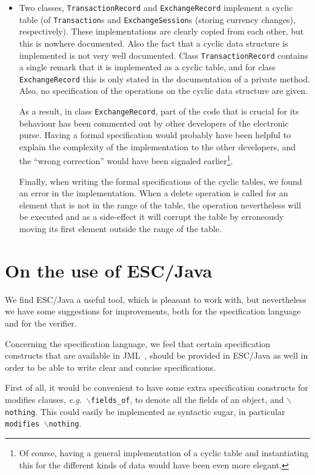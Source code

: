 \documentclass[a4paper]{llncs}
\newcommand{\noth}{\(\backslash\)\texttt{nothing}}
\newcommand{\fieldsof}{\(\backslash\)\texttt{fields\_of}}
\begin{document}
\begin{itemize}
\item Two classes, \texttt{TransactionRecord} and
\texttt{ExchangeRecord} implement a cyclic table (of
\texttt{Transaction}s and
\texttt{ExchangeSession}s (storing currency changes),
respectively).  These implementations are clearly copied from each
other, but this is nowhere documented. Also the fact that a
cyclic data structure is implemented is not very well documented. Class
\texttt{TransactionRecord} contains a single remark that it is
implemented as a cyclic table, and for class
\texttt{ExchangeRecord} this is only stated in the documentation of a
private method. Also, no specification of the operations on the cyclic
data structure are given.

As a result, in class \texttt{ExchangeRecord}, part of the code that
is crucial for its behaviour has been commented out by other
developers of the electronic purse. Having a formal specification
would probably have been helpful to explain the complexity of the
implementation to the other developers, and the ``wrong correction''
would have been signaled earlier\footnote{Of course, having a general 
implementation of a cyclic table and instantiating this for the
different kinds of data would have been even more elegant.}.

Finally, when writing the formal specifications of the cyclic tables,
we found an error in the implementation. When a delete operation is
called for an element that is not in the range of the table, the
operation nevertheless will be executed and as a side-effect it will
corrupt the table by erroneously moving its first element outside the
range of the table.
\end{itemize}


\section{On the use of ESC/Java}
\label{SectESC}
We find ESC/Java a useful tool, which is pleasant to work with, but
nevertheless we have some suggestions for improvements, both for the
specification language and for the verifier.

Concerning the specification language, we feel that certain
specification constructs that are available in JML~\cite{LeavensBR99},
should be provided in ESC/Java as well in order to be able to write
clear and concise specifications. 

First of all, it would be convenient to have some extra specification
constructs for modifies clauses, \emph{e.g.}~\fieldsof, to denote all
the fields of an object, and \noth. This could easily be implemented
as syntactic sugar, in particular \texttt{modifies \noth}.
\end{document}
